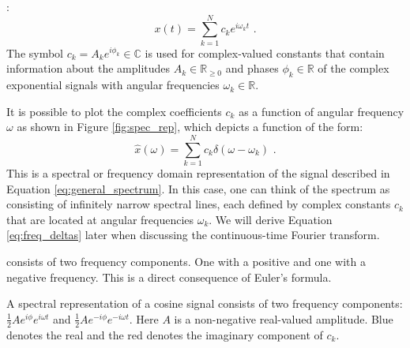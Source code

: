 :
\begin{equation}
x(t) = \sum_{k=1}^N c_k e^{i\omega_k t} \,\,.
\label{eq:general_spectrum}
\end{equation}
The symbol $c_k = A_k e^{i\phi_k} \in \mathbb{C}$ is used for complex-valued constants that contain information about the 
amplitudes $A_k \in \mathbb{R}_{\ge 0}$ and phases $\phi_k \in \mathbb{R}$ of the complex exponential signals with angular frequencies $\omega_k \in \mathbb{R}$.

It is possible to plot the complex coefficients $c_k$ as a function of angular frequency $\omega$ as shown in Figure \ref{fig:spec_rep}, which depicts a function of the form:
\begin{equation}
\hat{x}(\omega) = \sum_{k=1}^N c_k \delta(\omega - \omega_k) \,\,.
\label{eq:freq_deltas}
\end{equation}
This is a spectral or frequency domain representation of the signal described in Equation \ref{eq:general_spectrum}. 
In this case, one can think of the spectrum as consisting of infinitely narrow spectral lines, each defined by complex constants $c_k$ that are located at angular frequencies $\omega_k$. 
We will derive Equation \ref{eq:freq_deltas} later when discussing the continuous-time Fourier transform.

 consists of two frequency components. One with a positive and one with a negative frequency. This is a direct consequence of Euler's formula. 

\begin{marginfigure}
\begin{center}
\end{center}
\caption{A spectral representation of a cosine signal consists of two frequency components: $\frac{1}{2}Ae^{i\phi}e^{i\omega t}$ and $\frac{1}{2}Ae^{-i\phi}e^{-i\omega t}$. Here $A$ is a non-negative real-valued amplitude. Blue denotes the real and the red denotes the imaginary component of $c_k$.}
\label{fig:exspecsin}
\end{marginfigure}

